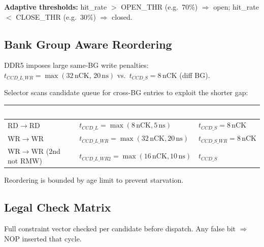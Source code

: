 \documentclass[11pt,a4paper]{article}
\newcommand{\THead}[1]{\cellcolor{navy}\textcolor{white}{\small\textbf{#1}}}
\newcommand{\RA}{\rowcolor{lgray}}
\newcommand{\RB}{\rowcolor{sky!30}}
\begin{document}
\textbf{Adaptive thresholds:} hit\_rate $>$ OPEN\_THR (e.g.\ 70\%) $\Rightarrow$ open;
hit\_rate $<$ CLOSE\_THR (e.g.\ 30\%) $\Rightarrow$ closed.

\subsection{Bank Group Aware Reordering}

DDR5 imposes large same-BG write penalties:
$t_{CCD\_L\_WR} = \max(32\,\text{nCK},\,20\,\text{ns})$
vs.\ $t_{CCD\_S} = 8\,\text{nCK}$ (diff BG).

Selector scans candidate queue for cross-BG entries to exploit the shorter gap:

\begin{center}
\begin{tabularx}{\linewidth}{@{} l l l @{}}
\toprule
\THead{Transition} & \THead{Same BG} & \THead{Diff BG} \\
\midrule
\RA RD$\to$RD & $t_{CCD\_L}=\max(8\,\text{nCK},5\,\text{ns})$ &
  $t_{CCD\_S}=8\,\text{nCK}$ \\
\RB WR$\to$WR & $t_{CCD\_L\_WR}=\max(32\,\text{nCK},20\,\text{ns})$ &
  $t_{CCD\_S\_WR}=8\,\text{nCK}$ \\
\RA WR$\to$WR (2nd not RMW) & $t_{CCD\_L\_WR2}=\max(16\,\text{nCK},10\,\text{ns})$ &
  $t_{CCD\_S}$ \\
\bottomrule
\end{tabularx}
\end{center}

Reordering is bounded by age limit to prevent starvation.

\subsection{Legal Check Matrix}

Full constraint vector checked per candidate before dispatch.
Any false bit $\Rightarrow$ NOP inserted that cycle.
\end{document}
